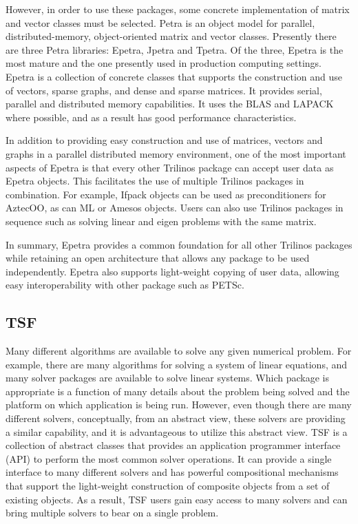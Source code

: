 \documentclass[12pt,relax]{TrilinosDevGuide}
\begin{document}
However, in order to use these packages, some concrete
implementation of matrix and vector classes must be selected.  
Petra is an object model for parallel,
distributed-memory, object-oriented matrix and vector classes.
Presently there are three Petra libraries: Epetra, Jpetra and Tpetra.
Of the three, Epetra is the most mature and the one presently used in
production computing settings.  Epetra is a collection of concrete
classes that supports the construction and use of vectors, sparse
graphs, and dense and sparse matrices.  It provides serial, parallel and
distributed memory
capabilities.  It uses the BLAS and LAPACK where possible, and as a
result has good performance characteristics.

In addition to providing easy construction and use of matrices,
vectors and graphs in a parallel distributed memory environment,
one of the most important aspects of Epetra is that every other
Trilinos package can accept user data as Epetra objects.  This
facilitates the use of multiple Trilinos packages in combination.  For
example, Ifpack objects can be used as preconditioners for AztecOO, as
can ML or Amesos objects.  Users can also use Trilinos packages in
sequence such as solving linear and eigen problems with the same
matrix.

In summary, Epetra provides a common foundation for all other Trilinos
packages while retaining an open architecture that allows any package
to be used independently.  Epetra also supports light-weight copying of
user data, allowing easy interoperability with other package such as
PETSc.

\subsection{TSF}
\label{subsect:InteropTSF}
Many different algorithms are available to solve any given numerical
problem.  For example, there are many algorithms for solving a system
of linear equations, and many solver packages are available to solve
linear systems.  Which package is appropriate is a function of
many details about the problem being solved and the platform on which
application is being run. However, even though
there are many different solvers, conceptually, from an abstract view,
these solvers are providing a similar capability, and it is
advantageous to utilize this abstract view.
TSF is a collection of abstract classes that provides an application
programmer interface (API) to perform the most common solver
operations.  It can provide a single interface to many different
solvers and has powerful compositional mechanisms that support the
light-weight construction of composite objects from a set of
existing objects.  As a result, TSF users gain easy access to many
solvers and can bring multiple solvers to bear on a single problem.
\end{document}
